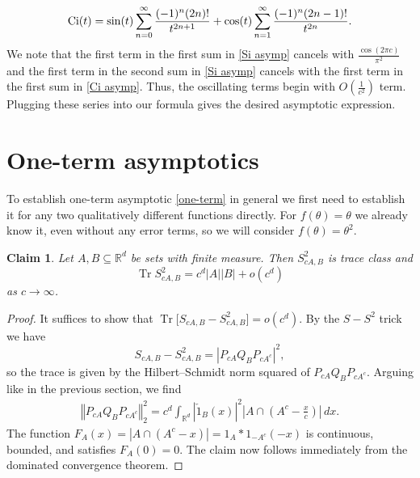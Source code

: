 \documentclass[12pt]{amsart}
\numberwithin{equation}{section}
\newcommand{\R}{\mathbb{R}}
\newcommand{\norm}[1]{\left\Vert #1 \right\Vert}
\newtheorem{claim}[Thm]{Claim}
\begin{document}
\begin{equation}\label{Ci asymp}
{\rm Ci}(t) = \sin(t) \sum_{n=0}^\infty \frac{(-1)^n(2n)!}{t^{2n+1}} + \cos(t)\sum_{n=1}^\infty \frac{(-1)^n(2n-1)!}{t^{2n}}.
\end{equation}
We note that the first term in the first sum in \eqref{Si asymp} cancels with $\frac{\cos(2\pi c)}{\pi^2}$ and the first term in the second sum in \eqref{Si asymp} cancels with the first term in the first sum in \eqref{Ci asymp}. Thus, the oscillating terms begin with $O(\frac{1}{c^2})$ term. Plugging these series into our formula gives the desired asymptotic expression.

\section{One-term asymptotics}

To establish one-term asymptotic \eqref{one-term} in general we first need to establish it for any two qualitatively different functions directly. For $f(\theta) = \theta$ we already know it, even without any error terms, so we will consider $f(\theta) = \theta^2$.

\begin{claim}\label{the trivial claim}
Let $A, B \subseteq \R^d$ be sets with finite measure. Then $S_{cA,B}^2$ is trace class and 
\[
\operatorname{Tr}S_{cA,B}^2 = c^d |A||B| + o(c^d) 
\]
as $c\to \infty$.
\end{claim}
\begin{proof}
It suffices to show that $\operatorname{Tr} \big[S_{cA,B}- S_{cA,B}^2\big] = o(c^d)$. By the $S-S^2$ trick we have
\[
S_{cA,B}- S_{cA,B}^2= \left|P_{cA} Q_B P_{cA^c}\right|^2,
\]
so the trace is given by the Hilbert--Schmidt norm squared of $P_{cA} Q_B P_{cA^c}$. Arguing like in the previous section, we find
\begin{align*}
\norm{P_{cA} Q_B P_{cA^c}}_2^2 = c^d \int_{\R^d} \left| \check{1}_B(x)\right|^2 \left|A \cap \left(A^c - \frac{x}{c}\right)\right| \, dx.
\end{align*}
The function $F_A(x) = |A \cap (A^c -x)| = 1_A \ast 1_{-A^c}(-x)$ is continuous, bounded, and satisfies $F_A(0) = 0$. The claim now follows immediately from the dominated convergence theorem. 
\end{proof}
\end{document}
